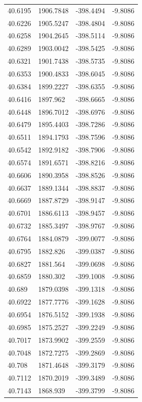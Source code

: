 \begin{table}[H]
\begin{tabular}{llll}
40.6195 & 1906.7848 & -398.4494 & -9.8086 \\
40.6226 & 1905.5247 & -398.4804 & -9.8086 \\
40.6258 & 1904.2645 & -398.5114 & -9.8086 \\
40.6289 & 1903.0042 & -398.5425 & -9.8086 \\
40.6321 & 1901.7438 & -398.5735 & -9.8086 \\
40.6353 & 1900.4833 & -398.6045 & -9.8086 \\
40.6384 & 1899.2227 & -398.6355 & -9.8086 \\
40.6416 & 1897.962 & -398.6665 & -9.8086 \\
40.6448 & 1896.7012 & -398.6976 & -9.8086 \\
40.6479 & 1895.4403 & -398.7286 & -9.8086 \\
40.6511 & 1894.1793 & -398.7596 & -9.8086 \\
40.6542 & 1892.9182 & -398.7906 & -9.8086 \\
40.6574 & 1891.6571 & -398.8216 & -9.8086 \\
40.6606 & 1890.3958 & -398.8526 & -9.8086 \\
40.6637 & 1889.1344 & -398.8837 & -9.8086 \\
40.6669 & 1887.8729 & -398.9147 & -9.8086 \\
40.6701 & 1886.6113 & -398.9457 & -9.8086 \\
40.6732 & 1885.3497 & -398.9767 & -9.8086 \\
40.6764 & 1884.0879 & -399.0077 & -9.8086 \\
40.6795 & 1882.826 & -399.0387 & -9.8086 \\
40.6827 & 1881.564 & -399.0698 & -9.8086 \\
40.6859 & 1880.302 & -399.1008 & -9.8086 \\
40.689 & 1879.0398 & -399.1318 & -9.8086 \\
40.6922 & 1877.7776 & -399.1628 & -9.8086 \\
40.6954 & 1876.5152 & -399.1938 & -9.8086 \\
40.6985 & 1875.2527 & -399.2249 & -9.8086 \\
40.7017 & 1873.9902 & -399.2559 & -9.8086 \\
40.7048 & 1872.7275 & -399.2869 & -9.8086 \\
40.708 & 1871.4648 & -399.3179 & -9.8086 \\
40.7112 & 1870.2019 & -399.3489 & -9.8086 \\
40.7143 & 1868.939 & -399.3799 & -9.8086 \\

\end{tabular}
\end{table}
